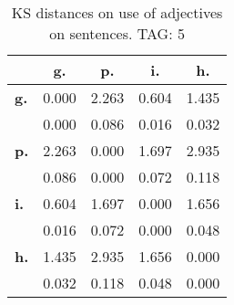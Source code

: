 \begin{table}[h!]
\begin{center}
\begin{tabular}{| l || c | c | c | c |}\hline
 & {\bf g.} & {\bf p.} & {\bf i.} & {\bf h.} \\\hline\hline
{\bf g.} & 0.000 & 2.263 & 0.604 & 1.435 \\
{\bf } & 0.000 & 0.086 & 0.016 & 0.032 \\\hline
{\bf p.} & 2.263 & 0.000 & 1.697 & 2.935 \\
{\bf } & 0.086 & 0.000 & 0.072 & 0.118 \\\hline
{\bf i.} & 0.604 & 1.697 & 0.000 & 1.656 \\
{\bf } & 0.016 & 0.072 & 0.000 & 0.048 \\\hline
{\bf h.} & 1.435 & 2.935 & 1.656 & 0.000 \\
{\bf } & 0.032 & 0.118 & 0.048 & 0.000 \\\hline
\end{tabular}
\caption{KS distances on use of adjectives on sentences. TAG: 5}
\end{center}
\end{table}